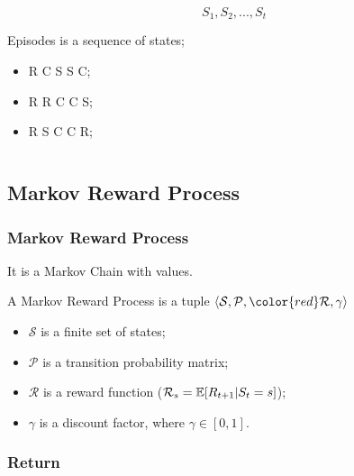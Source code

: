 \begin{frame}
\begin{columns}
\begin{column}{0.5\textwidth}
            $$S_1,S_2,...,S_t$$

            {\color{red}Episodes} is a sequence of states;

            \begin{itemize}
                \item R C S S C;
                \item R R C C S;
                \item R S C C R;
            \end{itemize}  
        \end{column}

    \end{columns}

\end{frame}

\subsection{Markov Reward Process}
\begin{frame}
    \frametitle{Markov Reward Process}
    It is a Markov Chain with values.
    \begin{definition}
        A Markov Reward Process is a tuple $\langle\mathcal{S},\mathcal{P},
        {\color{red}\mathcal{R},\gamma}\rangle$
        \begin{itemize}
            \item $\mathcal{S}$ is a finite set of {\color{red}states};

            \item $\mathcal{P}$ is a {\color{red}transition probability matrix};

            \item $\mathcal{R}$ is a {\color{red}reward function} ($\mathcal{R}_s = \operatorname*{\mathbb{E}}[R_{t+1}|S_t=s]$);

            \item $\gamma$ is a {\color{red} discount factor}, where $\gamma \in [0,1]$.
        \end{itemize}
    \end{definition}
\end{frame}

\subsubsection{Return}

